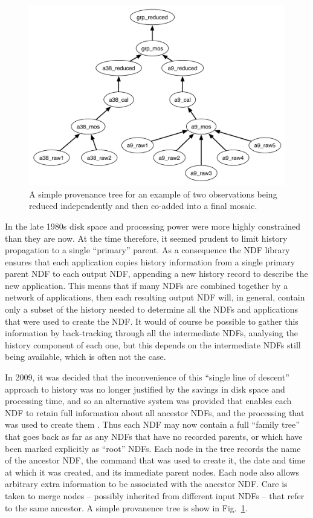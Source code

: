 \documentclass[final,authoryear,5p,times,twocolumn]{elsarticle}
\begin{document}
\begin{figure}
\includegraphics[width=\columnwidth]{provenance.pdf}
\caption{A simple provenance tree for an example of two observations
  being reduced independently and then co-added into a final
  mosaic.}
\label{fig:prov}
\end{figure}

In the late 1980s disk space and processing power were more highly
constrained than they are now. At the time therefore, it
seemed prudent to limit history propagation to a single ``primary''
parent.  As a consequence the NDF library ensures that each application
copies history information from a single primary parent NDF to each
output NDF, appending a new history record to describe the new
application. This means that if many NDFs are combined together by a
network of applications, then each resulting output NDF will, in
general, contain only a subset of the history needed to determine all
the NDFs and applications that were used to create the NDF. It would
of course be possible to gather this information by back-tracking
through all the intermediate NDFs, analysing the history component of
each one, but this depends on the intermediate NDFs still being
available, which is often not the case.

In 2009, it was decided that the inconvenience of this ``single line of
descent'' approach to history was no longer justified by the savings in
disk space and processing time, and so an alternative system was
provided that enables each NDF to retain full information about all
ancestor NDFs, and the processing that was used to create them \citep{2009ASPC..411..418J,2011tfa..confE..42J}. Thus
each NDF may now contain a full ``family tree'' that goes back as far as
any NDFs that have no recorded parents, or which have been marked
explicitly as ``root'' NDFs. Each node in the tree records the name of
the ancestor NDF, the command that was used to create it, the date and
time at which it was created, and its immediate parent nodes. Each
node also allows arbitrary extra information to be associated with the
ancestor NDF. Care is taken to merge nodes -- possibly inherited from
different input NDFs -- that refer to the same ancestor. A simple
provanence tree is show in Fig.~\ref{fig:prov}.
\end{document}
